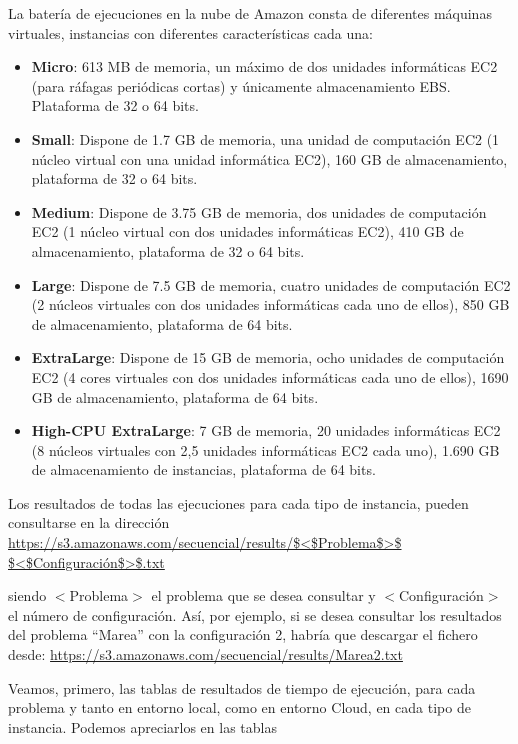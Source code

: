 \documentclass[runningheads]{llncs}
\begin{document}
La batería de ejecuciones en la nube de Amazon consta de diferentes máquinas virtuales, instancias con diferentes características 
cada una:

\begin{itemize}
 \item \textbf{Micro}: 613 MB de memoria, un máximo de dos unidades informáticas EC2 (para ráfagas periódicas cortas) y únicamente  
 almacenamiento EBS. Plataforma de 32 o 64 bits.
 \item \textbf{Small}: Dispone de 1.7 GB de memoria, una unidad de computación EC2 (1 núcleo virtual con una unidad informática EC2), 
 160 GB de almacenamiento, plataforma de 32 o 64 bits.
 \item \textbf{Medium}: Dispone de 3.75 GB de memoria, dos unidades de computación EC2 (1 núcleo virtual con dos unidades 
 informáticas EC2), 410 GB de almacenamiento, plataforma de 32 o 64 bits.
 \item \textbf{Large}: Dispone de 7.5 GB de memoria, cuatro unidades de computación EC2 (2 núcleos virtuales con dos unidades 
 informáticas cada uno de ellos), 850 GB de almacenamiento, plataforma de 64 bits.
 \item \textbf{ExtraLarge}: Dispone de 15 GB de memoria, ocho unidades de computación EC2 (4 cores virtuales con dos unidades 
 informáticas cada uno de ellos), 1690 GB de almacenamiento, plataforma de 64 bits.
 \item \textbf{High-CPU ExtraLarge}:  7 GB de memoria, 20 unidades informáticas EC2 (8 núcleos virtuales 
 con 2,5 unidades informáticas EC2 cada uno), 1.690 GB de almacenamiento de instancias, plataforma de 64 bits.
\end{itemize}


Los resultados de todas las ejecuciones para cada tipo de instancia, pueden consultarse en la dirección 
\url{https://s3.amazonaws.com/secuencial/results/$<$Problema$>$ $<$Configuración$>$.txt}

siendo $<$Problema$>$ el problema que se desea consultar y $<$Configuración$>$ el número de configuración. Así, por ejemplo, si se desea consultar los resultados del problema ``Marea'' con 
la configuración 2, habría que descargar el fichero desde: 
\url{https://s3.amazonaws.com/secuencial/results/Marea2.txt}

Veamos, primero, las tablas de resultados de tiempo de ejecución, para cada problema y tanto en entorno local, como en 
entorno Cloud, en cada tipo de instancia. Podemos apreciarlos en las tablas 
\end{document}
